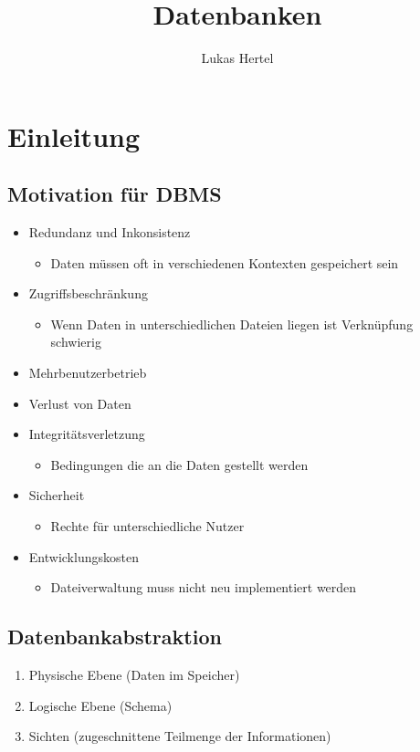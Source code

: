 \documentclass[a4paper, oneside]{book}
\title{Datenbanken}
\author{Lukas Hertel}
\begin{document}
  \maketitle
  \tableofcontents

  \chapter{Einleitung}
  \section{Motivation für DBMS}
  \begin{itemize}
    \item Redundanz und Inkonsistenz
    \begin{itemize}
      \item Daten müssen oft in verschiedenen Kontexten gespeichert sein
    \end{itemize}
    \item Zugriffsbeschränkung
    \begin{itemize}
      \item Wenn Daten in unterschiedlichen Dateien liegen ist Verknüpfung schwierig
    \end{itemize}
    \item Mehrbenutzerbetrieb
    \item Verlust von Daten
    \item Integritätsverletzung
    \begin{itemize}
      \item Bedingungen die an die Daten gestellt werden
    \end{itemize}
    \item Sicherheit
    \begin{itemize}
      \item Rechte für unterschiedliche Nutzer
    \end{itemize} 
    \item Entwicklungskosten
    \begin{itemize}
      \item Dateiverwaltung muss nicht neu implementiert werden
    \end{itemize}
  \end{itemize}
  
  \section{Datenbankabstraktion}
  \begin{enumerate}
    \item Physische Ebene (Daten im Speicher)
    \item Logische Ebene (Schema)
    \item Sichten (zugeschnittene Teilmenge der Informationen)
  \end{enumerate}
\end{document}
